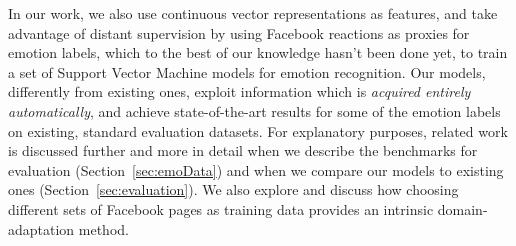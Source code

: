 \documentclass[11pt]{article}
\begin{document}

In our work, we also use continuous vector representations as features, and take advantage of distant supervision by using Facebook reactions as proxies for emotion labels, which to the best of our knowledge hasn't been done yet, to train a set of Support Vector Machine models for emotion recognition. Our models, differently from existing ones, exploit information which is \textit{acquired entirely automatically}, and achieve state-of-the-art results for some of the emotion labels on existing, standard evaluation datasets. For explanatory purposes, related work is discussed further and more in detail when we describe the benchmarks for evaluation (Section~\ref{sec:emoData}) and when we compare our models to existing ones (Section~\ref{sec:evaluation}). We also explore and discuss how choosing different sets of Facebook pages as training data provides an intrinsic domain-adaptation method.



%


%



%
\end{document}
